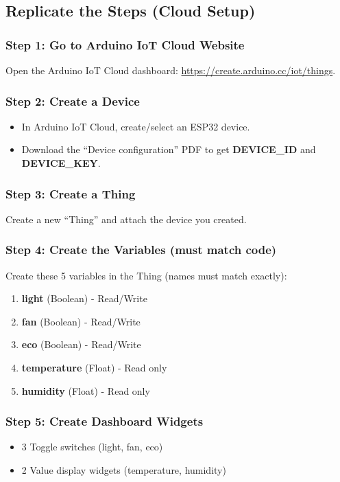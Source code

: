 \documentclass[12pt,a4paper]{article}
\begin{document}
\subsection{Replicate the Steps (Cloud Setup)}

\subsubsection{Step 1: Go to Arduino IoT Cloud Website}
Open the Arduino IoT Cloud dashboard: \url{https://create.arduino.cc/iot/things}.

\subsubsection{Step 2: Create a Device}
\begin{itemize}
\item In Arduino IoT Cloud, create/select an ESP32 device.
\item Download the ``Device configuration'' PDF to get \textbf{DEVICE\_ID} and \textbf{DEVICE\_KEY}.
\end{itemize}

\subsubsection{Step 3: Create a Thing}
Create a new ``Thing'' and attach the device you created.

\subsubsection{Step 4: Create the Variables (must match code)}
Create these 5 variables in the Thing (names must match exactly):

\begin{enumerate}
\item \textbf{light} (Boolean) - Read/Write
\item \textbf{fan} (Boolean) - Read/Write
\item \textbf{eco} (Boolean) - Read/Write
\item \textbf{temperature} (Float) - Read only
\item \textbf{humidity} (Float) - Read only
\end{enumerate}

\subsubsection{Step 5: Create Dashboard Widgets}
\begin{itemize}
\item 3 Toggle switches (light, fan, eco)
\item 2 Value display widgets (temperature, humidity)
\end{itemize}
\end{document}
